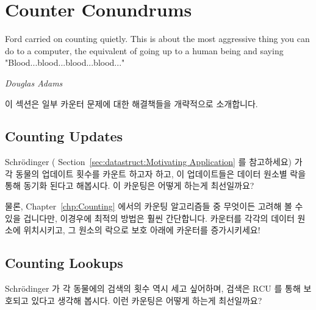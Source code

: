 
\section{Counter Conundrums}
\label{sec:together:Counter Conundrums}
%
\epigraph{Ford carried on counting quietly.
	  This is about the most aggressive thing you can do to a
	  computer, the equivalent of going up to a human being and saying
	  "Blood...blood...blood...blood..."}
	 {\emph{Douglas Adams}}

이 섹션은 일부 카운터 문제에 대한 해결책들을 개략적으로 소개합니다.
\iffalse

This section outlines possible solutions to some counter conundrums.
\fi

\subsection{Counting Updates}
\label{sec:together:Counting Updates}

Schr\"odinger (
Section~\ref{sec:datastruct:Motivating Application} 를 참고하세요) 가 각 동물의
업데이트 횟수를 카운트 하고자 하고, 이 업데이트들은 데이터 원소별 락을 통해
동기화 된다고 해봅시다.
이 카운팅은 어떻게 하는게 최선일까요?

물론,
Chapter~\ref{chp:Counting}
에서의 카운팅 알고리즘들 중 무엇이든 고려해 볼 수 있을 겁니다만, 이경우에
최적의 방법은 훨씬 간단합니다.
카운터를 각각의 데이터 원소에 위치시키고, 그 원소의 락으로 보호 아래에 카운터를
증가시키세요!
\iffalse

Suppose that Schr\"odinger (see
Section~\ref{sec:datastruct:Motivating Application})
wants to count the number of updates for each animal,
and that these updates are synchronized using a per-data-element lock.
How can this counting best be done?

Of course, any number of counting algorithms from
Chapter~\ref{chp:Counting}
might be considered, but the optimal approach is much simpler in this case.
Just place a counter in each data element, and increment it under the
protection of that element's lock!
\fi

\subsection{Counting Lookups}
\label{sec:together:Counting Lookups}

Schr\"odinger 가 각 동물에의 검색의 횟수 역시 세고 싶어하며, 검색은 RCU 를 통해
보호되고 있다고 생각해 봅시다.
이런 카운팅은 어떻게 하는게 최선일까요?

